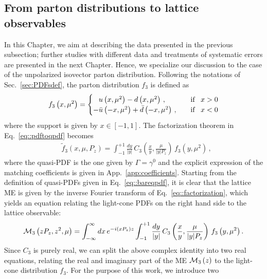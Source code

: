 \subsection{From parton distributions to lattice observables}
\label{subsec:thpredictions}
In this Chapter, we aim at describing the data presented in the previous subsection;
further studies with different data and treatments of systematic
errors are presented in the next Chapter. Hence, we specialize our discussion
to the case of the unpolarized isovector parton distribution. Following the
notations of Sec.~\ref{sec:PDFsdef}, the parton distribution $f_{3}$ is
defined as
\begin{align}
	f_{3}\lp x, \mu^2 \rp = 
	\begin{cases}
      \phantom{-} u\lp x, \mu^2 \rp - d\lp x, \mu^2\rp\, , \quad                 %
      &\text{if} \,\,\,\,\, x > 0 \\
      -\bar{u}\lp -x, \mu^2 \rp + \bar{d}\lp -x, \mu^2 \rp\, , \quad %
      &\text{if} \,\,\,\,\, x < 0 
	\end{cases}
\end{align} 
where the support is given by $x\in \left[ -1, 1 \right]$. The factorization
theorem in Eq.~\eqref{eq::pdftoqpdf} becomes
\begin{align}
	\label{eq::factorization}
	  & \tilde{f}_{3}\left(x,\mu,P_z\right) = \int_{-1}^{+1} \frac{dy}{|y|}\,C_3\left(\frac{x}{y},\frac{\mu}{|y|P_z}\right)\, 
	  f_{3}\left(y,\mu^2\right)\, ,
\end{align}
where the quasi-PDF is the one given by $\Gamma = \gamma^0$ and the explicit
expression of the matching coefficients is given in
App.~\ref{app:coefficients}. Starting from the definition of quasi-PDFs
given in Eq.~\eqref{eq::bareqpdf}, it is clear that the lattice ME is given by the
inverse Fourier transform of Eq.~\eqref{eq::factorization}, which yields an
equation relating the light-cone PDFs on the right hand side to the lattice observable:
\begin{align}
	\label{eq:factorisedME}
	\mathcal{M}_{3}\left( z P_z, z^2,\mu\right) = 
	\int_{-\infty}^{\infty} dx \, e^{-i \left( x P_z \right) z} 
	\int_{-1}^{+1} \frac{dy}{|y|}\,
	C_3\left(\frac{x}{y},\frac{\mu}{|y|P_z}\right)\, 
	f_{3}\left(y,\mu^2\right). 
\end{align}
Since $C_3$ is purely real, we can split the above complex identity into two real equations, relating the
real and imaginary part of the ME $\mathcal{M}_{3}\left( z \right)$ to the
light-cone distribution $f_{3}$. For the purpose of this work, we introduce two
